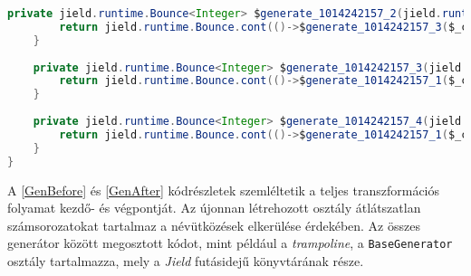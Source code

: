 \begin{lstlisting}[language=Java, caption={Az $1, 2$ sorozatot előállító generátor a transzformáció után}, captionpos=b, label=GenAfter, escapechar=!]
    private jield.runtime.Bounce<Integer> $generate_1014242157_2(jield.runtime.GeneratorState<java.lang.Integer> $_contParam) { 
        return jield.runtime.Bounce.cont(()->$generate_1014242157_3($_contParam), 2);                                           
    }                                                                                                                           
                                                                                                                                
    private jield.runtime.Bounce<Integer> $generate_1014242157_3(jield.runtime.GeneratorState<java.lang.Integer> $_contParam) { 
        return jield.runtime.Bounce.cont(()->$generate_1014242157_1($_contParam));                                              
    }                                                                                                                           
                                                                                                                                
    private jield.runtime.Bounce<Integer> $generate_1014242157_4(jield.runtime.GeneratorState<java.lang.Integer> $_contParam) { 
        return jield.runtime.Bounce.cont(()->$generate_1014242157_1($_contParam));                                              
    }                                                                                                                           
}                                                                                                                               
\end{lstlisting}

A \ref{GenBefore} és \ref{GenAfter} kódrészletek szemléltetik a teljes transzformációs folyamat kezdő- és végpontját. Az újonnan létrehozott osztály átlátszatlan számsorozatokat tartalmaz a névütközések elkerülése érdekében. Az összes generátor között megosztott kódot, mint például a \textit{trampoline}, a \texttt{BaseGenerator} osztály tartalmazza, mely a \textit{Jield} futásidejű könyvtárának része.